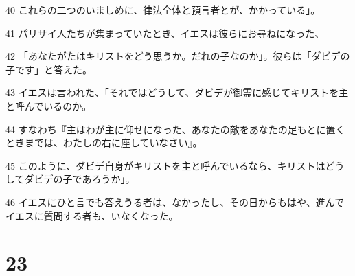 \par 40 これらの二つのいましめに、律法全体と預言者とが、かかっている」。
\par 41 パリサイ人たちが集まっていたとき、イエスは彼らにお尋ねになった、
\par 42 「あなたがたはキリストをどう思うか。だれの子なのか」。彼らは「ダビデの子です」と答えた。
\par 43 イエスは言われた、「それではどうして、ダビデが御霊に感じてキリストを主と呼んでいるのか。
\par 44 すなわち『主はわが主に仰せになった、あなたの敵をあなたの足もとに置くときまでは、わたしの右に座していなさい』。
\par 45 このように、ダビデ自身がキリストを主と呼んでいるなら、キリストはどうしてダビデの子であろうか」。
\par 46 イエスにひと言でも答えうる者は、なかったし、その日からもはや、進んでイエスに質問する者も、いなくなった。

\chapter{23}

